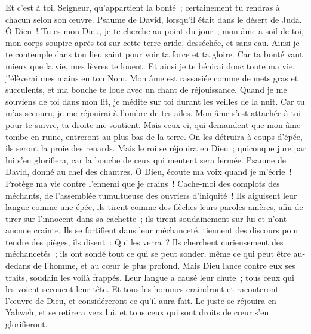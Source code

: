 \begin{multicols}{2}
Et c'est à toi, Seigneur, qu'appartient la bonté~; certainement tu rendras à chacun selon son œuvre.
\VerseOne{}Psaume de David, lorsqu'il était dans le désert de Juda.
Ô Dieu~! Tu es mon Dieu, je te cherche au point du jour~; mon âme a soif de toi, mon corps soupire après toi sur cette terre aride, desséchée, et sans eau.
Ainsi je te contemple dans ton lieu saint pour voir ta force et ta gloire.
Car ta bonté vaut mieux que la vie, mes lèvres te louent.
Et ainsi je te bénirai donc toute ma vie, j'élèverai mes mains en ton Nom.
Mon âme est rassasiée comme de mets gras et succulents, et ma bouche te loue avec un chant de réjouissance.
Quand je me souviens de toi dans mon lit, je médite sur toi durant les veilles de la nuit.
Car tu m'as secouru, je me réjouirai à l'ombre de tes ailes.
Mon âme s'est attachée à toi pour te suivre, ta droite me soutient.
Mais ceux-ci, qui demandent que mon âme tombe en ruine, entreront au plus bas de la terre.
On les détruira à coups d'épée, ils seront la proie des renards.
Mais le roi se réjouira en Dieu~; quiconque jure par lui s'en glorifiera, car la bouche de ceux qui mentent sera fermée.
\VerseOne{}Psaume de David, donné au chef des chantres.
Ô Dieu, écoute ma voix quand je m'écrie~! Protège ma vie contre l'ennemi que je crains~!
Cache-moi des complots des méchants, de l'assemblée tumultueuse des ouvriers d'iniquité~!
Ils aiguisent leur langue comme une épée, ils tirent comme des flèches leurs paroles amères,
afin de tirer sur l'innocent dans sa cachette~; ils tirent soudainement sur lui et n'ont aucune crainte.
Ils se fortifient dans leur méchanceté, tiennent des discours pour tendre des pièges, ils disent~: Qui les verra~?
Ils cherchent curieusement des méchancetés~; ils ont sondé tout ce qui se peut sonder, même ce qui peut être au-dedans de l'homme, et au cœur le plus profond.
Mais Dieu lance contre eux ses traits, soudain les voilà frappés.
Leur langue a causé leur chute~; tous ceux qui les voient secouent leur tête.
Et tous les hommes craindront et raconteront l'œuvre de Dieu, et considéreront ce qu'il aura fait.
Le juste se réjouira en Yahweh, et se retirera vers lui, et tous ceux qui sont droits de cœur s'en glorifieront.

\end{multicols}
